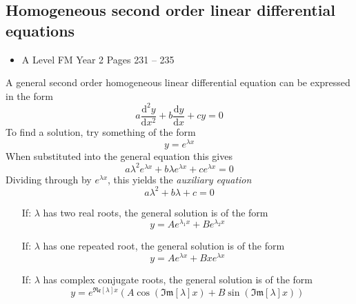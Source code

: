 \documentclass[11pt, a4paper]{article}
\begin{document}
\subsection{Homogeneous second order linear differential equations}
\begin{itemize}
\item A Level FM Year 2 \hspace{1cm} \phantom{AS /} Pages 231 -- 235
\end{itemize} \par
A general second order homogeneous linear differential equation can be expressed in the form
\begin{equation*}
a\frac{\mathrm{d}^{2}y}{\mathrm{d}x^{2}}+b\frac{\mathrm{d}y}{\mathrm{d}x}+cy=0
\end{equation*}
To find a solution, try something of the form
\begin{equation*}
y=e^{\lambda x}
\end{equation*}
When substituted into the general equation this gives
\begin{equation*}
a\lambda^{2}e^{\lambda x}+b\lambda e^{\lambda x} + c e^{\lambda x}=0
\end{equation*}
Dividing through by $e^{\lambda x}$, this yields the \emph{auxiliary equation}
\begin{equation*}
a\lambda^{2}+b\lambda+c=0
\end{equation*}
\begin{itemize}
\item[If:] $\lambda$ has two real roots, the general solution is of the form
\begin{equation*}
y=Ae^{\lambda_{1}x}+Be^{\lambda_{2}x}
\end{equation*}
\item[If:] $\lambda$ has one repeated root, the general solution is of the form
\begin{equation*}
y=Ae^{\lambda x}+Bxe^{\lambda x}
\end{equation*}
\item[If:] $\lambda$ has complex conjugate roots, the general solution is of the form
\begin{equation*}
y=e^{\mathfrak{Re}[\lambda]x}\left(A\cos\left(\mathfrak{Im}[\lambda]x\right)+B\sin\left(\mathfrak{Im}[\lambda]x\right)\right)
\end{equation*}
\end{itemize}
\vspace{0.5cm}
\end{document}
